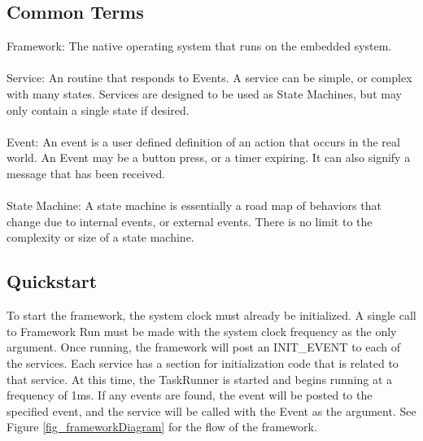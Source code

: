 \documentclass[12pt compsoc]{article}
\begin{document}
\subsection{Common Terms}
Framework: The native operating system that runs on the embedded system.
\\\\
Service: An routine that responds to Events. A service can be simple, or complex with many states. Services are designed to be used as State Machines, but may only contain a single state if desired.
\\\\
Event: An event is a user defined definition of an action that occurs in the real world. An Event may be a button press, or a timer expiring. It can also signify a message that has been received.
\\\\
State Machine: A state machine is essentially a road map of behaviors that change due to internal events, or external events. There is no limit to the complexity or size of a state machine.



\subsection{Quickstart}

 To start the  framework, the system clock must already be initialized. A single call to Framework Run must be made with the system clock frequency as the only argument. Once running, the framework will post an INIT\_EVENT to each of the services. Each service has a section for initialization code that is related to that service. At this time, the TaskRunner is started and begins running at a frequency of 1ms. If any events are found, the event will be posted to the specified event, and the service will be called with the Event as the argument. See Figure \ref{fig_frameworkDiagram} for the flow of the framework.
 
\end{document}
